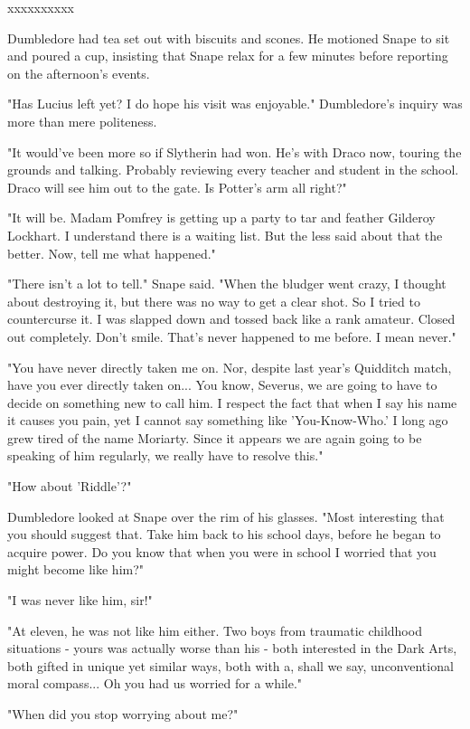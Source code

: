\documentclass[a4paper,11pt]{article}
\begin{document}
xxxxxxxxxx

Dumbledore had tea set out with biscuits and scones. He motioned Snape to sit and poured a cup, insisting that Snape relax for a few minutes before reporting on the afternoon's events.

"Has Lucius left yet? I do hope his visit was enjoyable." Dumbledore's inquiry was more than mere politeness.

"It would've been more so if Slytherin had won. He's with Draco now, touring the grounds and talking. Probably reviewing every teacher and student in the school. Draco will see him out to the gate. Is Potter's arm all right?"

"It will be. Madam Pomfrey is getting up a party to tar and feather Gilderoy Lockhart. I understand there is a waiting list. But the less said about that the better. Now, tell me what happened."

"There isn't a lot to tell." Snape said. "When the bludger went crazy, I thought about destroying it, but there was no way to get a clear shot. So I tried to countercurse it. I was slapped down and tossed back like a rank amateur. Closed out completely. Don't smile. That's never happened to me before. I mean never."

"You have never directly taken me on. Nor, despite last year's Quidditch match, have you ever directly taken on... You know, Severus, we are going to have to decide on something new to call him. I respect the fact that when I say his name it causes you pain, yet I cannot say something like 'You-Know-Who.' I long ago grew tired of the name Moriarty. Since it appears we are again going to be speaking of him regularly, we really have to resolve this."

"How about 'Riddle'?"

Dumbledore looked at Snape over the rim of his glasses. "Most interesting that you should suggest that. Take him back to his school days, before he began to acquire power. Do you know that when you were in school I worried that you might become like him?"

"I was never like him, sir!"

"At eleven, he was not like him either. Two boys from traumatic childhood situations - yours was actually worse than his - both interested in the Dark Arts, both gifted in unique yet similar ways, both with a, shall we say, unconventional moral compass... Oh you had us worried for a while."

"When did you stop worrying about me?"
\end{document}
